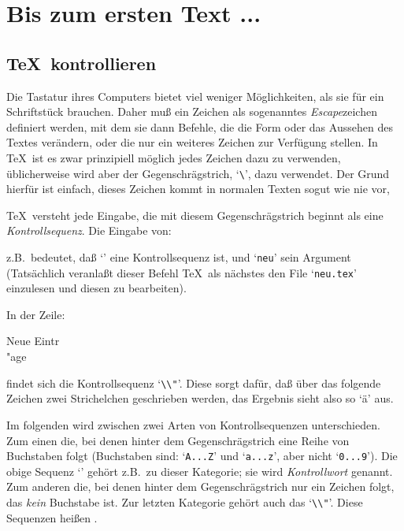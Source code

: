 \chapter{Bis zum ersten Text ...}
\section{\TeX\ kontrollieren}
Die Tastatur ihres Computers bietet viel weniger M\"oglichkeiten, als
sie f\"ur ein 
Schriftst\"uck brauchen. Daher mu\ss{} ein Zeichen als
sogenanntes 
{\em Escape}zeichen definiert werden, mit dem sie dann
Befehle, die die Form oder das Aussehen des Textes ver\"andern, oder die
nur ein weiteres Zeichen zur Verf\"ugung stellen. In \TeX\ ist es zwar
prinzipiell m\"oglich jedes Zeichen dazu zu verwenden, \"ublicherweise
wird aber der 
Gegenschr\"agstrich, `\verb|\|', dazu verwendet. Der Grund
hierf\"ur ist einfach, dieses Zeichen kommt in normalen Texten sogut wie
nie vor,

\TeX\ versteht jede 
Eingabe, die mit diesem 
Gegenschr\"agstrich beginnt
als eine  {\em Kon\-troll\-se\-quenz}. Die Eingabe von:
\begin{verbatim*}

\end{verbatim*}
z.B.\ bedeutet, da\ss{} `\verb||' eine 
Kontrollsequenz ist, und
`\verb|neu|' sein 
Argument (Tats\"achlich veranla\ss{}t dieser Befehl \TeX\
als n\"achstes den 
File `\verb|neu.tex|' einzulesen und diesen zu be\-ar\-bei\-ten).

In der Zeile:
\begin{verbatim*}
Neue Eintr\\"age
\end{verbatim*}
findet sich die 
Kontrollsequenz `\verb|\\"|'. Diese sorgt daf\"ur, da\ss{}
\"uber das folgende Zeichen zwei Strichelchen geschrieben werden, das
Ergebnis sieht also so `\"a' aus.

Im folgenden wird zwischen zwei Arten von 
Kontrollsequenzen
unterschieden. Zum einen die, bei denen hinter dem
Gegenschr\"agstrich
eine Reihe von Buchstaben folgt (Buchstaben sind: `\verb|A...Z|' und
`\verb|a...z|', aber nicht `\verb|0...9|'). Die obige Sequenz
`\verb||' geh\"ort z.B.\ zu dieser Kategorie; sie wird {\em
Kontrollwort} genannt. Zum anderen die, bei denen hinter dem
Gegenschr\"agstrich nur ein Zeichen folgt, das {\em kein} Buchstabe ist.
Zur letzten Kategorie geh\"ort auch das `\verb|\\"|'. Diese Sequenzen
hei\ss{}en \index{Kontrollzeichen}{\em Kontrollzeichen}.

